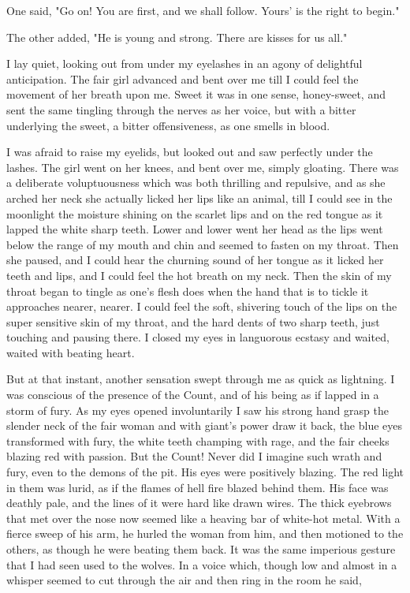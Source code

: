 One said, "Go on! You are first, and we shall follow. Yours' is the right to begin." 

The other added, "He is young and strong. There are kisses for us all." 

I lay quiet, looking out from under my eyelashes in an agony of delightful anticipation. The fair girl advanced and bent over me till I could feel the movement of her breath upon me. Sweet it was in one sense, honey-sweet, and sent the same tingling through the nerves as her voice, but with a bitter underlying the sweet, a bitter offensiveness, as one smells in blood. 

I was afraid to raise my eyelids, but looked out and saw perfectly under the lashes. The girl went on her knees, and bent over me, simply gloating. There was a deliberate voluptuousness which was both thrilling and repulsive, and as she arched her neck she actually licked her lips like an animal, till I could see in the moonlight the moisture shining on the scarlet lips and on the red tongue as it lapped the white sharp teeth. Lower and lower went her head as the lips went below the range of my mouth and chin and seemed to fasten on my throat. Then she paused, and I could hear the churning sound of her tongue as it licked her teeth and lips, and I could feel the hot breath on my neck. Then the skin of my throat began to tingle as one's flesh does when the hand that is to tickle it approaches nearer, nearer. I could feel the soft, shivering touch of the lips on the super sensitive skin of my throat, and the hard dents of two sharp teeth, just touching and pausing there. I closed my eyes in languorous ecstasy and waited, waited with beating heart. 

But at that instant, another sensation swept through me as quick as lightning. I was conscious of the presence of the Count, and of his being as if lapped in a storm of fury. As my eyes opened involuntarily I saw his strong hand grasp the slender neck of the fair woman and with giant's power draw it back, the blue eyes transformed with fury, the white teeth champing with rage, and the fair cheeks blazing red with passion. But the Count! Never did I imagine such wrath and fury, even to the demons of the pit. His eyes were positively blazing. The red light in them was lurid, as if the flames of hell fire blazed behind them. His face was deathly pale, and the lines of it were hard like drawn wires. The thick eyebrows that met over the nose now seemed like a heaving bar of white-hot metal. With a fierce sweep of his arm, he hurled the woman from him, and then motioned to the others, as though he were beating them back. It was the same imperious gesture that I had seen used to the wolves. In a voice which, though low and almost in a whisper seemed to cut through the air and then ring in the room he said, 


